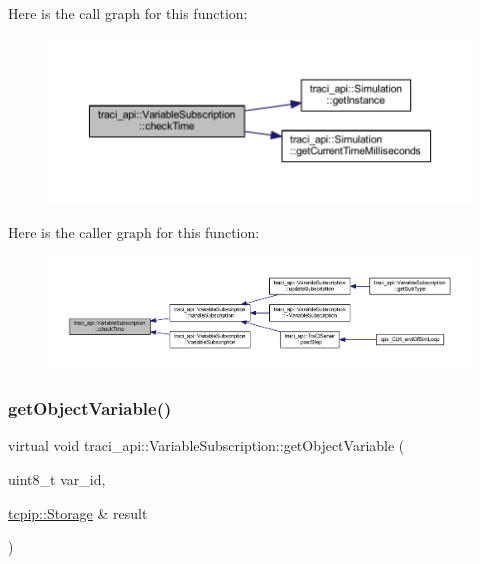 Here is the call graph for this function\+:
\nopagebreak
\begin{figure}[H]
\begin{center}
\leavevmode
\includegraphics[width=350pt]{classtraci__api_1_1_variable_subscription_a6e17a9560c53c7c9543599f93caeeaf8_cgraph}
\end{center}
\end{figure}
Here is the caller graph for this function\+:
\nopagebreak
\begin{figure}[H]
\begin{center}
\leavevmode
\includegraphics[width=350pt]{classtraci__api_1_1_variable_subscription_a6e17a9560c53c7c9543599f93caeeaf8_icgraph}
\end{center}
\end{figure}
\mbox{\label{classtraci__api_1_1_variable_subscription_a884dba03a44455e86c417c3641ec6aa4}} 
\subsubsection{\texorpdfstring{get\+Object\+Variable()}{getObjectVariable()}}
{\footnotesize\ttfamily virtual void traci\+\_\+api\+::\+Variable\+Subscription\+::get\+Object\+Variable (\begin{DoxyParamCaption}\item[{uint8\+\_\+t}]{var\+\_\+id,  }\item[{\hyperlink{classtcpip_1_1_storage}{tcpip\+::\+Storage} \&}]{result }\end{DoxyParamCaption})\hspace{0.3cm}{\ttfamily [pure virtual]}}



